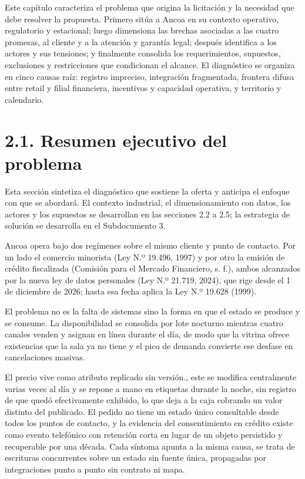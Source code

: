 \documentclass[11pt]{article}
\begin{document}
Este capítulo caracteriza el problema que origina la licitación y la necesidad que debe resolver la propuesta. Primero sitúa a Ancoa en su contexto operativo, regulatorio y estacional; luego dimensiona las brechas asociadas a las cuatro promesas, al cliente y a la atención y garantía legal; después identifica a los actores y sus tensiones; y finalmente consolida los requerimientos, supuestos, exclusiones y restricciones que condicionan el alcance. El diagnóstico se organiza en cinco causas raíz: registro impreciso, integración fragmentada, frontera difusa entre retail y filial financiera, incentivos y capacidad operativa, y territorio y calendario.

\section{2.1. Resumen ejecutivo del problema}\label{resumen-ejecutivo-del-problema}

Esta sección sintetiza el diagnóstico que sostiene la oferta y anticipa el enfoque con que se abordará. El contexto industrial, el dimensionamiento con datos, los actores y los supuestos se desarrollan en las secciones 2.2 a 2.5; la estrategia de solución se desarrolla en el Subdocumento 3.

Ancoa opera bajo dos regímenes sobre el mismo cliente y punto de contacto. Por un lado el comercio minorista (Ley N.º 19.496, 1997) y por otro la emisión de crédito fiscalizada (Comisión para el Mercado Financiero, s. f.), ambos alcanzados por la nueva ley de datos personales (Ley N.º 21.719, 2024), que rige desde el 1 de diciembre de 2026; hasta esa fecha aplica la Ley N.º 19.628 (1999).

El problema no es la falta de sistemas sino la forma en que el estado se produce y se consume. La disponibilidad se consolida por lote nocturno mientras cuatro canales venden y asignan en línea durante el día, de modo que la vitrina ofrece existencias que la sala ya no tiene y el pico de demanda convierte ese desfase en cancelaciones masivas.

El precio vive como atributo replicado sin versión., este se modifica centralmente varias veces al día y se repone a mano en etiquetas durante la noche, sin registro de que quedó efectivamente exhibido, lo que deja a la caja cobrando un valor distinto del publicado. El pedido no tiene un estado único consultable desde todos los puntos de contacto, y la evidencia del consentimiento en crédito existe como evento telefónico con retención corta en lugar de un objeto persistido y recuperable por una década. Cada síntoma apunta a la misma causa, se trata de escrituras concurrentes sobre un estado sin fuente única, propagadas por integraciones punto a punto sin contrato ni mapa.
\end{document}
